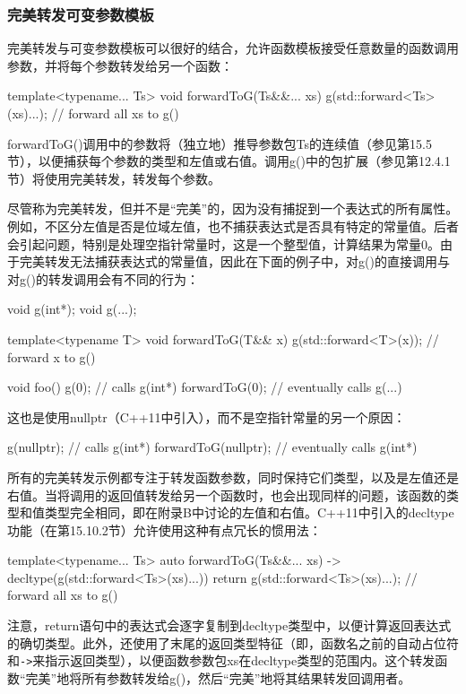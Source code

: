 \subsubsection{完美转发可变参数模板}

完美转发与可变参数模板可以很好的结合，允许函数模板接受任意数量的函数调用参数，并将每个参数转发给另一个函数：

\begin{cpp}
template<typename... Ts> void forwardToG(Ts&&... xs)
{
	g(std::forward<Ts>(xs)...); // forward all xs to g()
}
\end{cpp}

forwardToG()调用中的参数将（独立地）推导参数包Ts的连续值（参见第15.5节），以便捕获每个参数的类型和左值或右值。调用g()中的包扩展（参见第12.4.1节）将使用完美转发，转发每个参数。

尽管称为完美转发，但并不是“完美”的，因为没有捕捉到一个表达式的所有属性。例如，不区分左值是否是位域左值，也不捕获表达式是否具有特定的常量值。后者会引起问题，特别是处理空指针常量时，这是一个整型值，计算结果为常量0。由于完美转发无法捕获表达式的常量值，因此在下面的例子中，对g()的直接调用与对g()的转发调用会有不同的行为：

\begin{cpp}
void g(int*);
void g(...);

template<typename T> void forwardToG(T&& x)
{
	g(std::forward<T>(x)); // forward x to g()
}

void foo()
{
	g(0); // calls g(int*)
	forwardToG(0); // eventually calls g(...)
}
\end{cpp}

这也是使用nullptr（C++11中引入），而不是空指针常量的另一个原因：

\begin{cpp}
g(nullptr); // calls g(int*)
forwardToG(nullptr); // eventually calls g(int*)
\end{cpp}

所有的完美转发示例都专注于转发函数参数，同时保持它们类型，以及是左值还是右值。当将调用的返回值转发给另一个函数时，也会出现同样的问题，该函数的类型和值类型完全相同，即在附录B中讨论的左值和右值。C++11中引入的decltype功能（在第15.10.2节）允许使用这种有点冗长的惯用法：

\begin{cpp}
template<typename... Ts>
auto forwardToG(Ts&&... xs) -> decltype(g(std::forward<Ts>(xs)...))
{
	return g(std::forward<Ts>(xs)...); // forward all xs to g()
}
\end{cpp}

注意，return语句中的表达式会逐字复制到decltype类型中，以便计算返回表达式的确切类型。此外，还使用了末尾的返回类型特征（即，函数名之前的自动占位符和\texttt{->}来指示返回类型），以便函数参数包xs在decltype类型的范围内。这个转发函数“完美”地将所有参数转发给g()，然后“完美”地将其结果转发回调用者。

